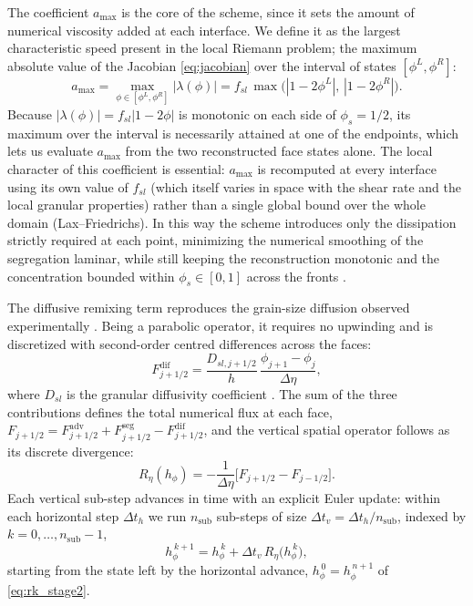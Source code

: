 \documentclass[lineno]{JFM-FLM_Au}
\begin{document}
The coefficient $a_{\max}$ is the core of the scheme, since it sets the amount of numerical viscosity added at each interface. We define it as the largest characteristic speed present in the local Riemann problem; the maximum absolute value of the Jacobian \eqref{eq:jacobian} over the interval of states $[\phi^L,\phi^R]$:
\begin{equation}
    a_{\max} = \max_{\phi \in [\phi^L,\phi^R]} |\lambda(\phi)| = f_{sl}\, \max\big(|1-2\phi^L|,\, |1-2\phi^R|\big).
    \label{eq:amax}
\end{equation}
Because $|\lambda(\phi)|=f_{sl}|1-2\phi|$ is monotonic on each side of $\phi_s=1/2$, its maximum over the interval is necessarily attained at one of the endpoints, which lets us evaluate $a_{\max}$ from the two reconstructed face states alone. The local character of this coefficient is essential: $a_{\max}$ is recomputed at every interface using its own value of $f_{sl}$ (which itself varies in space with the shear rate and the local granular properties) rather than a single global bound over the whole domain (Lax--Friedrichs). In this way the scheme introduces only the dissipation strictly required at each point, minimizing the numerical smoothing of the segregation laminar, while still keeping the reconstruction monotonic and the concentration bounded within $\phi_s\in[0,1]$ across the fronts \citep{toro2009}.

The diffusive remixing term reproduces the grain-size diffusion observed experimentally \citep{graychugunov2006}. Being a parabolic operator, it requires no upwinding and is discretized with second-order centred differences across the faces:
\begin{equation}
    F^{\mathrm{dif}}_{j+1/2} = \frac{D_{sl,j+1/2}}{h}\, \frac{\phi_{j+1}-\phi_j}{\Delta \eta},
    \label{eq:diff_flux}
\end{equation}
where $D_{sl}$ is the granular diffusivity coefficient \citep{trewhela2021}. The sum of the three contributions defines the total numerical flux at each face, $F_{j+1/2}=F^{\mathrm{adv}}_{j+1/2}+F^{\mathrm{seg}}_{j+1/2}-F^{\mathrm{dif}}_{j+1/2}$, and the vertical spatial operator follows as its discrete divergence:
\begin{equation}
    R_\eta(h_\phi) = -\frac{1}{\Delta \eta}\big[F_{j+1/2}-F_{j-1/2}\big].
    \label{eq:Reta}
\end{equation}
Each vertical sub-step advances in time with an explicit Euler update: within each horizontal step $\Delta t_h$ we run $n_{\mathrm{sub}}$ sub-steps of size $\Delta t_v=\Delta t_h/n_{\mathrm{sub}}$, indexed by $k=0,\dots,n_{\mathrm{sub}}-1$,
\begin{equation}
    h_\phi^{\,k+1} = h_\phi^{\,k} + \Delta t_v\, R_\eta\big(h_\phi^{\,k}\big),
    \label{eq:euler_vert}
\end{equation}
starting from the state left by the horizontal advance, $h_\phi^{\,0}=h_\phi^{\,n+1}$ of \eqref{eq:rk_stage2}.
\end{document}
